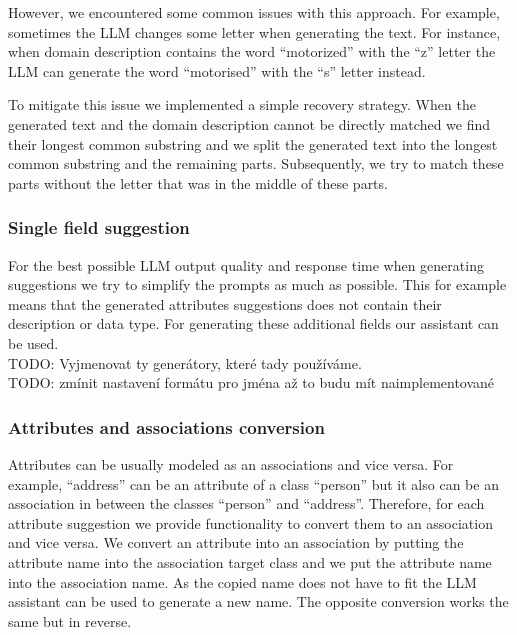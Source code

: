 


However, we encountered some common issues with this approach. For example, sometimes the LLM changes some letter when generating the text. For instance, when domain description contains the word ``motorized'' with the ``z'' letter the LLM can generate the word ``motorised'' with the ``s'' letter instead.

To mitigate this issue we implemented a simple recovery strategy. When the generated text and the domain description cannot be directly matched we find their longest common substring and we split the generated text into the longest common substring and the remaining parts. Subsequently, we try to match these parts without the letter that was in the middle of these parts.


\subsubsection{Single field suggestion}

For the best possible LLM output quality and response time when generating suggestions we try to simplify the prompts as much as possible. This for example means that the generated attributes suggestions does not contain their description or data type. For generating these additional fields our assistant can be used. \\

TODO: Vyjmenovat ty generátory, které tady používáme. \\

TODO: zmínit nastavení formátu pro jména až to budu mít naimplementované \\


\subsubsection{Attributes and associations conversion}

Attributes can be usually modeled as an associations and vice versa. For example, ``address'' can be an attribute of a class ``person'' but it also can be an association in between the classes ``person'' and ``address''. Therefore, for each attribute suggestion we provide functionality to convert them to an association and vice versa. We convert an attribute into an association by putting the attribute name into the association target class and we put the attribute name into the association name. As the copied name does not have to fit the LLM assistant can be used to generate a new name. The opposite conversion works the same but in reverse.


